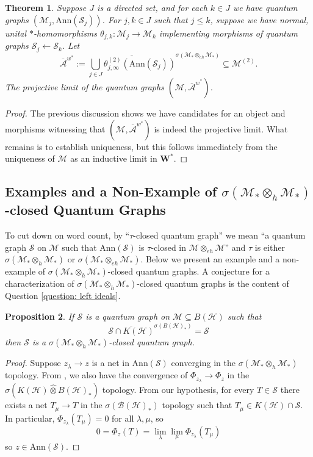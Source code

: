 \documentclass[12pt]{article}
\newtheorem{theorem}{Theorem}[section]
\newtheorem{proposition}[theorem]{Proposition}
\theoremstyle{definition}
\newcommand{\mc}[1]{\mathcal{#1}}
\newcommand{\<}{\langle}
\renewcommand{\>}{\rangle}
\newcommand{\Ann}{\text{Ann}}
\renewcommand{\hat}[1]{\widehat{#1}}
\renewcommand{\subset}{\subseteq}
\newcommand{\eh}{\otimes_{eh}}
\newcommand{\h}{\otimes_{h}}
\renewcommand{\bar}[1]{\overline{#1}}
\begin{document}
\begin{theorem} \label{thm: qraphlim}
    Suppose $J$ is a directed set, and for each $k \in J$ we have quantum graphs $(\mc M_j, \Ann(\mc S_j))$. For $j,k \in J$ such that $j \le k$, suppose we have normal, unital $*$-homomorphisms $\theta_{j,k}: \mc M_j \to \mc M_k$  implementing morphisms of quantum graphs $\mc S_j \leftarrow \mc S_k$. Let 
    \[
    \overline{\mc A}^{w^*} := \overline{\bigcup_{j \in J} \theta_{j,\infty}^{(2)}(\Ann(\mc S_j))}^{\sigma(\mc M_* \otimes_{eh} \mc M_*)} \subseteq \mc M^{(2)}.
    \]
    The projective limit of the quantum graphs $(\mc M, \overline{\mc A}^{w^*})$.
\end{theorem}
\begin{proof}
    The previous discussion shows we have candidates for an object and morphisms witnessing that $(\mc M, \bar {\mc A}^{w^*})$ is indeed the projective limit. What remains is to establish uniqueness, but this follows immediately from the uniqueness of $\mc M$ as an inductive limit in $\mathbf{W^*}$. 
\end{proof}

\subsection{Examples and a Non-Example of \texorpdfstring{$\sigma(\mc M_* \h \mc M_*)$}{}-closed Quantum Graphs} \label{subsec: h-closed qgraphs}

To cut down on word count, by ``$\tau$-closed quantum graph'' we mean ``a quantum graph $\mc S$ on $\mc M$ such that $\Ann(\mc S)$ is $\tau$-closed in $\mc M \eh \mc M$'' and $\tau$ is either $\sigma(\mc M_* \h \mc M_*)$ or $\sigma(\mc M_* \eh \mc M_*)$. Below we present an example and a non-example of $\sigma(\mc M_* \h \mc M_*)$-closed quantum graphs. A conjecture for a characterization of $\sigma(\mc M_* \h \mc M_*)$-closed quantum graphs is the content of Question \ref{question: left ideals}.

\begin{proposition} \label{prop: K(H) example}
    If $\mc S$ is a quantum graph on $\mc M \subset B(\mc H)$ such that 
    \[
    \overline{\mc S \cap K(\mc H) }^{\sigma(B(\mc H)_*)} = \mc S
    \]
    then $\mc S$ is a $\sigma(\mc M_* \h \mc M_*)$-closed quantum graph.
\end{proposition}
\begin{proof}
    Suppose $z_\lambda \to z$ is a net in $\Ann(\mc S)$ converging in the $\sigma(\mc M_* \h \mc M_*)$ topology. From \cite[Theorem 4.2(ii)]{blecher-smith-w*h}, we also have the convergence of $\Phi_{z_\lambda} \to \Phi_z$ in the $\sigma(K(\mc H) \hat \otimes B(\mc H)_*)$ topology. From our hypothesis, for every $T \in \mc S$ there exists a net $T_\mu \to T$ in the $\sigma(\mc B(\mc H)_*)$ topology such that $T_\mu \in K(\mc H) \cap \mc S$. In particular, $ \Phi_{z_\lambda}(T_\mu) = 0$ for all $\lambda, \mu$, so
    \[
    0 = \Phi_z(T) = \lim_\lambda \lim_\mu \Phi_{z_\lambda}(T_\mu) 
    \]
    so $z \in \Ann(\mc S)$.
\end{proof}
\end{document}
